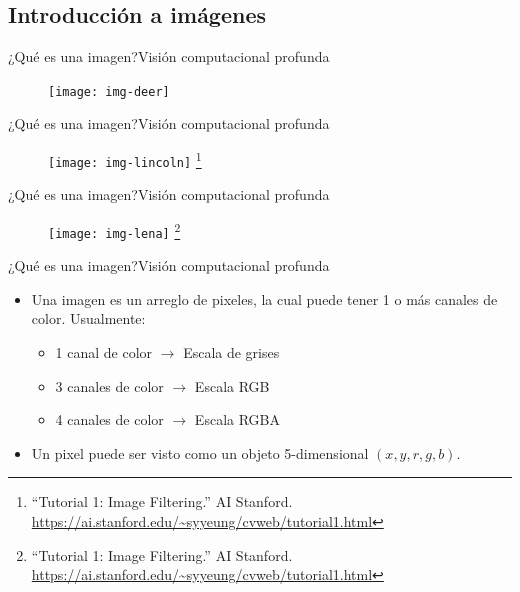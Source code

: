 \documentclass[10pt,border=3pt,tikz]{beamer}
\begin{document}
    \subsection{Introducción a imágenes}
    \begin{frame}{¿Qué es una imagen?}{Visión computacional profunda}
        \begin{figure}
            \centering
            \texttt{[image: img-deer]}
        \end{figure}
    \end{frame}
    
    \begin{frame}{¿Qué es una imagen?}{Visión computacional profunda}
        \begin{figure}
            \centering
            \texttt{[image: img-lincoln]}
            \let\thefootnote\relax\footnote{{\tiny “Tutorial 1: Image Filtering.” AI Stanford. \url{https://ai.stanford.edu/~syyeung/cvweb/tutorial1.html}}}
        \end{figure}
    \end{frame}
    
    \begin{frame}{¿Qué es una imagen?}{Visión computacional profunda}
        \begin{figure}
            \centering
            \texttt{[image: img-lena]}
            \let\thefootnote\relax\footnote{{\tiny “Tutorial 1: Image Filtering.” AI Stanford. \url{https://ai.stanford.edu/~syyeung/cvweb/tutorial1.html}}}
        \end{figure}
    \end{frame}
    
    \begin{frame}{¿Qué es una imagen?}{Visión computacional profunda}
        \begin{itemize}
            \item Una imagen es un arreglo de pixeles, la cual puede tener 1 o más canales de color. Usualmente:
            \begin{itemize}
                \item 1 canal de color $\rightarrow$ Escala de grises
                \item 3 canales de color $\rightarrow$ Escala RGB
                \item 4 canales de color $\rightarrow$ Escala RGBA
            \end{itemize}
            \item Un pixel puede ser visto como un objeto 5-dimensional $(x, y, r, g, b)$.
        \end{itemize}
    \end{frame}
    
\end{document}
